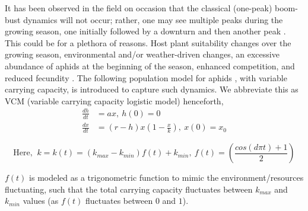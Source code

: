 \documentclass[sn-mathphys-num]{sn-jnl}
\numberwithin{equation}{section}
\numberwithin{equation}{section}
\begin{document}
It has been observed in the field on occasion that the classical (one-peak) boom-bust dynamics will not occur; rather, one may see multiple peaks during the growing season, one initially followed by a downturn and then another peak \cite{D90}. This could be for a plethora of reasons. Host plant suitability changes over the growing season, environmental and/or weather-driven changes, an excessive abundance of aphids at the beginning of the season, enhanced competition, and reduced fecundity \cite{K07, Ke50}.
The following population model for aphids \cite{K07}, with variable carrying capacity, is introduced to capture such dynamics. We abbreviate this as VCM (variable carrying capacity logistic model) henceforth,
\begin{equation}
\begin{split}
\label{eq:1}
\frac{dh}{dt} &= a x, \ h(0) =0 \\
\frac{dx}{dt} &=  (r-h)x\left(1-\frac{x}{k}\right),  \ x(0) =x_{0}
\end{split}
\end{equation}


\begin{equation}
\label{eq:22a}
\text{Here, } \ 
k=k(t)=\left( k_{max} - k_{min}\right)f(t) + k_{min}, \
f(t) = \left(\frac{cos( d \pi t)+1}{2}\right)
\end{equation}

$f(t)$ is modeled as a trigonometric function to mimic the environment/resources fluctuating, such that the total carrying capacity fluctuates between $k_{max}$ and $k_{min}$ values (as $f(t)$ fluctuates between $0$ and $1$).


\end{document}
